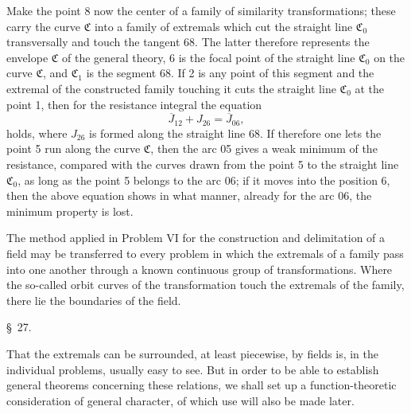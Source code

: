 \documentclass[11pt,a4paper,leqno]{article}
\begin{document}
Make the point 8 now the center of a family of similarity transformations; these carry the curve $\mathfrak{C}$
into a family of extremals which cut the straight line $\mathfrak{C}_0$ transversally and touch the tangent 68. The latter therefore represents the envelope $\mathfrak{C}$ of the general theory, 6 is the focal point of the straight line $\mathfrak{C}_0$ on the curve $\mathfrak{C}$, and $\mathfrak{C}_1$ is the segment 68. If 2 is any point of this segment and the extremal of the constructed family touching it cuts the straight line $\mathfrak{C}_0$ at the point 1, then for the resistance integral the equation
\[
\overline{J}_{12}+J_{26}=\overline{J}_{06},
\]
holds, where $J_{26}$ is formed along the straight line 68. If therefore one lets the point 5 run along the curve $\mathfrak{C}$, then the arc 05 gives a weak minimum of the resistance, compared with the curves drawn from the point 5 to the straight line $\mathfrak{C}_0$, as long as the point 5 belongs to the arc 06; if it moves into the position 6, then the above equation shows in what manner, already for the arc 06, the minimum property is lost.

The method applied in Problem VI for the construction and delimitation of a field may be transferred to every problem in which the extremals of a family pass into one another through a known continuous group of transformations. Where the so-called orbit curves of the transformation touch the extremals of the family, there lie the boundaries of the field.


\begin{center}{\large \S~27.}\end{center}

That the extremals can be surrounded, at least piecewise, by fields is, in the individual problems, usually easy to see. But in order to be able to establish general theorems concerning these relations, we shall set up a function-theoretic consideration of general character, of which use will also be made later.
\end{document}
